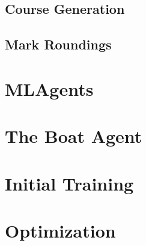 \subsection{Course Generation}

\subsection{Mark Roundings}

\section{MLAgents}

\section{The Boat Agent}

\section{Initial Training}

\section{Optimization}

\label{sec:sec01}





